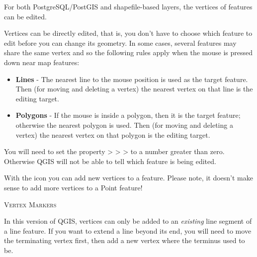 
For both PostgreSQL/PostGIS and shapefile-based layers, the vertices of
features can be edited. 

Vertices can be directly edited, that is, you don't have to choose which
feature to edit before you can change its geometry.
In some cases, several features may share the same vertex
and so the following rules apply when the mouse is pressed
down near map features:

\begin{itemize}
\item \textbf{Lines}    - The nearest line to the mouse position
                          is used as the target feature.
                          Then (for moving and deleting a vertex)
                          the nearest vertex
                          on that line is the editing target.

\item \textbf{Polygons} - If the mouse is inside a polygon, then it is
                          the target feature; otherwise the nearest polygon
                          is used.
                          Then (for moving and deleting a vertex)
                          the nearest vertex
                          on that polygon is the editing target.
\end{itemize}

You will need to set the property  >
 >
> to a number greater than
zero. Otherwise QGIS will not be able to tell which feature is being edited.

With the  icon you can add new
vertices to a feature. Please note, it
doesn't make sense to add more vertices to a Point feature!

\begin{Tip}[ht]\caption{\textsc{Vertex Markers}}
\end{Tip}

In this version of QGIS, vertices can only be added to an \textit{existing}
line segment of a line feature. If you want to extend a line beyond its end,
you will need to move the terminating vertex first, then add a new vertex where
the terminus used to be.

